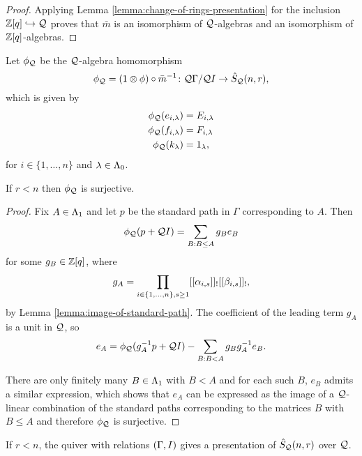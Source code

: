 \documentclass[a4paper, 11pt]{report}
\begin{document}
\begin{proof}
Applying Lemma \ref{lemma:change-of-rings-presentation} for the inclusion $\mathbb{Z}[q]\hookrightarrow\mathcal{Q}$ proves that $\bar{m}$ is an isomorphism of $\mathcal{Q}$-algebras and an isomorphism of $\mathbb{Z}[q]$-algebras.
\end{proof}

Let $\phi_{\mathcal{Q}}$ be the $\mathcal{Q}$-algebra homomorphism
\begin{equation*}
\phi_{\mathcal{Q}}=(1\otimes \phi)\circ \bar{m}^{-1}\colon \mathcal{Q}\Gamma/{\mathcal{Q} I}\to\hat{S}_{\mathcal{Q}}(n,r),
\end{equation*}
which is given by
\begin{align*}
\phi_{\mathcal{Q}}(e_{i,\lambda}) &= E_{i,\lambda}\\
\phi_{\mathcal{Q}}(f_{i,\lambda}) &= F_{i,\lambda}\\
\phi_{\mathcal{Q}}(k_\lambda) &= 1_\lambda,
\end{align*}
for $i\in\{1,\ldots,n\}$ and $\lambda\in\Lambda_0{}$.

\begin{proposition}\label{proposition:q-schur-presentation}
If $r<n$ then $\phi_{\mathcal{Q}}$ is surjective.
\end{proposition}

\begin{proof}
Fix $A\in\Lambda_1{}$ and let $p$ be the standard path in $\Gamma$ corresponding to $A$. Then
\begin{equation*}
\phi_{\mathcal{Q}}(p+\mathcal{Q} I) = \sum_{B:B\le A} g_Be_B
\end{equation*}
for some $g_B\in\mathbb{Z}[q]$, where
\begin{equation*}
g_A = \prod_{i\in\{1,\ldots,n\},s\geq 1}[[\alpha_{i,s}]]_![[\beta_{i,s}]]_!,
\end{equation*}
by Lemma \ref{lemma:image-of-standard-path}. The coefficient of the leading term $g_A$ is a unit in $\mathcal{Q}$, so
\begin{equation*}
e_A = \phi_{\mathcal{Q}}(g_A^{-1}p+\mathcal{Q} I) - \sum_{B:B<A} g_Bg_A^{-1} e_B.
\end{equation*}

There are only finitely many $B\in\Lambda_1{}$ with $B<A$ and for each such $B$, $e_B$ admits a similar expression, which shows that $e_A$ can be expressed as the image of a $\mathcal{Q}$-linear combination of the standard paths corresponding to the matrices $B$ with $B\le A$ and therefore $\phi_{\mathcal{Q}}$ is surjective.
\end{proof}

\begin{conjecture}
If $r<n$, the quiver with relations $(\Gamma,I)$ gives a presentation of $\hat{S}_{\mathcal{Q}}(n,r)$ over $\mathcal{Q}$.
\end{conjecture}
\end{document}
